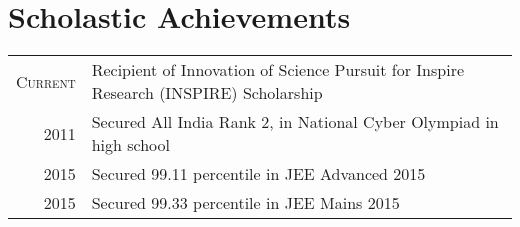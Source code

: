 \documentclass[a4paper,10pt]{extarticle} %
\begin{document}

 \section{Scholastic Achievements}

\begin{tabular}{r|p{18cm}}
\textsc{Current} &{Recipient of Innovation of Science Pursuit for Inspire Research (INSPIRE) Scholarship}
\vspace{1mm} \\
\textsc{2011} &{Secured All India Rank 2, in National Cyber Olympiad in high school}
\vspace{1mm} \\
\textsc{2015} &{Secured 99.11 percentile in JEE Advanced 2015}
\vspace{1mm} \\
\textsc{2015} &{Secured 99.33 percentile in JEE Mains 2015}
\vspace{1mm} \\ 
\end{tabular}


\end{document}
